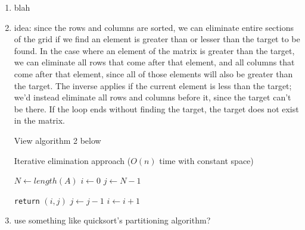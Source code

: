 \documentclass[12pt]{article}
\begin{document}
\begin{enumerate}
    \item blah
    \item idea: since the rows and columns are sorted, we can eliminate entire sections of the grid if we find an element 
    is greater than or lesser than the target to be found. In the case where an element of the matrix is greater than the 
    target, we can eliminate all rows that come after that element, and all columns that come after that element, since 
    all of those elements will also be greater than the target. The inverse applies if the current element is less than 
    the target; we'd instead eliminate all rows and columns before it, since the target can't be there. If the loop ends 
    without finding the target, the target does not exist in the matrix.
    
    View algorithm 2 below
    
    \begin{algorithm}
        \caption{Iterative elimination approach ($O(n)$ time with constant space)}\label{alg:gridsearch}
        \begin{algorithmic}
            \State $N \gets length(A)$
            \State $i \gets 0$
            \State $j \gets N - 1$
            
                    \State \texttt{return} $(i, j)$
                \Else
                        \State $j \gets j - 1$
                    \Else
                        \State $i \gets i + 1$
                    \EndIf
                \EndIf
            \EndWhile
        \end{algorithmic}
    \end{algorithm}
    
    \item use something like quicksort's partitioning algorithm?
\end{enumerate}
\end{document}

